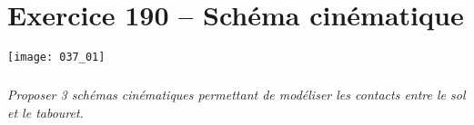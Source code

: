 \section*{Exercice 190 -- Schéma cinématique}
\setcounter{exo}{0}


\begin{center}
\texttt{[image: 037\_01]}
\end{center}

\subparagraph{}
\textit{Proposer 3 schémas cinématiques permettant de modéliser les contacts entre le sol et le tabouret.}
\ifprof
\begin{corrige}

\end{corrige}
\else
\fi
